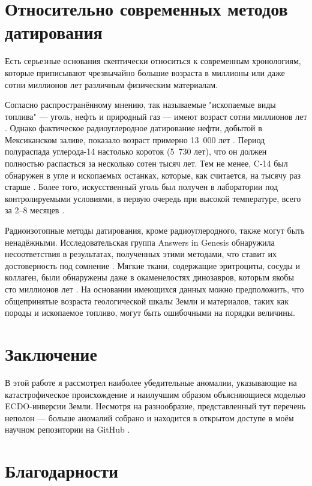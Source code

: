 \documentclass[10pt,twocolumn,letterpaper]{article}
\begin{document}
\section{Относительно современных методов датирования}

Есть серьезные основания скептически относиться к современным хронологиям, которые приписывают чрезвычайно большие возраста в миллионы или даже сотни миллионов лет различным физическим материалам.

Согласно распространённому мнению, так называемые "ископаемые виды топлива" — уголь, нефть и природный газ — имеют возраст сотни миллионов лет \cite{104}. Однако фактическое радиоуглеродное датирование нефти, добытой в Мексиканском заливе, показало возраст примерно 13~000 лет \cite{105}. Период полураспада углерода-14 настолько короток (5~730 лет), что он должен полностью распасться за несколько сотен тысяч лет. Тем не менее, C-14 был обнаружен в угле и ископаемых останках, которые, как считается, на тысячу раз старше \cite{106}. Более того, искусственный уголь был получен в лаборатории под контролируемыми условиями, в первую очередь при высокой температуре, всего за 2–8 месяцев \cite{107}.

Радиоизотопные методы датирования, кроме радиоуглеродного, также могут быть ненадёжными. Исследовательская группа Answers in Genesis обнаружила несоответствия в результатах, полученных этими методами, что ставит их достоверность под сомнение \cite{108}. Мягкие ткани, содержащие эритроциты, сосуды и коллаген, были обнаружены даже в окаменелостях динозавров, которым якобы сто миллионов лет \cite{109,110}. На основании имеющихся данных можно предположить, что общепринятые возраста геологической шкалы Земли и материалов, таких как породы и ископаемое топливо, могут быть ошибочными на порядки величины.

\section{Заключение}

В этой работе я рассмотрел наиболее убедительные аномалии, указывающие на катастрофическое происхождение и наилучшим образом объясняющиеся моделью ECDO-инверсии Земли. Несмотря на разнообразие, представленный тут перечень неполон — больше аномалий собрано и находится в открытом доступе в моём научном репозитории на GitHub \cite{2}.

\section{Благодарности}
\end{document}
